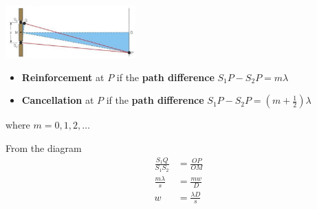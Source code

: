 \begin{center}
    \includegraphics[width=5cm]{img/slits}
\end{center}

\begin{itemize}
    \item \textbf{Reinforcement} at $P$ if the \textbf{path difference} $S_1P-S_2P=m\lambda$
    \item \textbf{Cancellation} at $P$ if the \textbf{path difference} $S_1P-S_2P=\left(m+\frac{1}{2}\right)\lambda$
\end{itemize}
where $m=0,1,2,\dots$

From the diagram
\begin{align*}
    \frac{S_1Q}{S_1S_2}&=\frac{OP}{OM}\\
    \frac{m\lambda}{s}&=\frac{mw}{D}\\
    w&=\frac{\lambda D}{s}
\end{align*}
